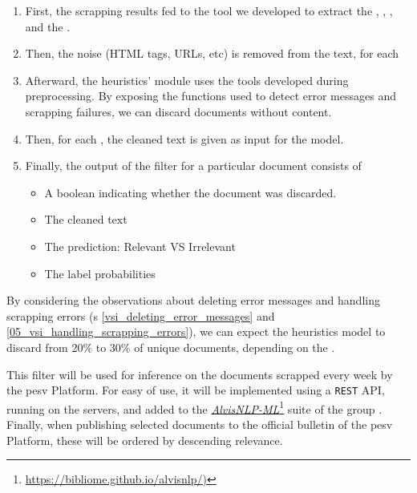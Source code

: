 \begin{enumerate}
    \item First, the scrapping results fed to the tool we developed to extract the \trafilaturaTitle{}, \trafilaturaAbstract{}, \trafilaturaFulltext{}, and the \translationTitle{}.

    \item Then, the noise (HTML tags, URLs, etc) is removed from the text, for each \contentType{}
    
    \item Afterward, the heuristics' module uses the tools developed during preprocessing. By exposing the functions used to detect error messages and scrapping failures, we can discard documents without content.


    \item  Then, for each \contentType{}, the cleaned text is given as input for the \textclassification{} model.

    \item Finally, the output of the filter for a particular document consists of
    \begin{itemize}
        \item A boolean indicating whether the document was discarded.
        \item The cleaned text
        \item The prediction: Relevant VS Irrelevant
        \item The label probabilities
    \end{itemize}


\end{enumerate}

By considering the observations about deleting error messages and handling scrapping errors (\headerName{}s \ref{vsi_deleting_error_messages} and \ref{05_vsi_handling_scrapping_errors}), we can expect the heuristics model to discard from 20\% to 30\% of unique documents, depending on the \contentType{}.

This filter will be used for inference on the documents scrapped every week by the \gls{pesv} Platform. For easy of use, it will be implemented using a \texttt{REST} API, running on the \MAIAGE{} servers, and added to the \href{https://bibliome.github.io/alvisnlp/)}{\emph{AlvisNLP-ML}}\footnote{\url{https://bibliome.github.io/alvisnlp/)}} suite of the \bibliome{} group .
Finally, when publishing selected documents to the official bulletin of the   \gls{pesv} Platform, these will be ordered by descending relevance.



